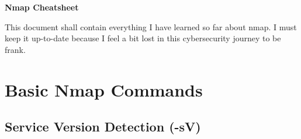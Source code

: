 \documentclass[11pt,a4paper]{article}
\begin{document}
\begin{center}
    \begin{tcolorbox}[width=\textwidth, colback=sectioncolor!20, colframe=sectioncolor]
        \centering
        {\Huge \textbf{Nmap Cheatsheet}}\\[0.5em]
    \end{tcolorbox}
\end{center}

\tableofcontents
\clearpage

\vspace{1em}
\begin{tcolorbox}[colback=codebackground, colframe=warningcolor]
    This document shall contain everything I have learned so far about nmap. I must keep it up-to-date because I feel a bit lost in this cybersecurity journey to be frank.
\end{tcolorbox}

\section{Basic Nmap Commands}

\subsection{Service Version Detection (-sV)}
\end{document}
